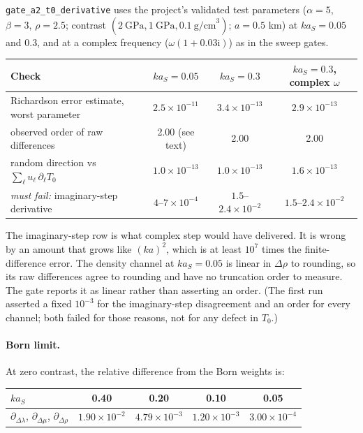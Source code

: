 \documentclass[11pt,a4paper]{article}
\newcommand{\ii}{\mathrm{i}}
\newcommand{\Tz}{T_0}
\begin{document}
\nolinkurl{gate_a2_t0_derivative} uses the project's validated test parameters ($\alpha=5$,
$\beta=3$, $\rho=2.5$; contrast $(2\ \text{GPa}, 1\ \text{GPa}, 0.1\ \text{g/cm}^3)$; $a=0.5$ km)
at $ka_S = 0.05$ and $0.3$, and at a complex frequency ($\omega(1+0.03\ii)$) as in the sweep
gates.

\begin{center}
\small
\setlength{\tabcolsep}{4pt}\begin{tabular}{@{}lccc@{}}
\toprule
Check & $ka_S=0.05$ & $ka_S=0.3$ & $ka_S=0.3$, complex $\omega$ \\
\midrule
Richardson error estimate, worst parameter & $2.5\times10^{-11}$ & $3.4\times10^{-13}$ & $2.9\times10^{-13}$ \\
observed order of raw differences & 2.00 (see text) & 2.00 & 2.00 \\
random direction vs $\sum_\ell u_\ell\,\partial_\ell\Tz$ & $1.0\times10^{-13}$ & $1.0\times10^{-13}$ & $1.6\times10^{-13}$ \\
\emph{must fail:} imaginary-step derivative & $4$--$7\times10^{-4}$ & $1.5$--$2.4\times10^{-2}$ & $1.5$--$2.4\times10^{-2}$ \\
\bottomrule
\end{tabular}
\end{center}

The imaginary-step row is what complex step would have delivered. It is wrong by an amount that
grows like $(ka)^2$, which is at least $10^7$ times the finite-difference error. The density
channel at $ka_S = 0.05$ is linear in $\Delta\rho$ to rounding, so its raw differences agree to
rounding and have no truncation order to measure. The gate reports it as linear rather than
asserting an order. (The first run asserted a fixed $10^{-3}$ for the imaginary-step disagreement
and an order for every channel; both failed for those reasons, not for any defect in $\Tz$.)

\paragraph{Born limit.} At zero contrast, the relative difference from the Born weights is:

\begin{center}
\small
\begin{tabular}{@{}lcccc@{}}
\toprule
$ka_S$ & 0.40 & 0.20 & 0.10 & 0.05 \\
\midrule
$\partial_{\Delta\lambda}$, $\partial_{\Delta\mu}$, $\partial_{\Delta\rho}$ &
$1.90\times10^{-2}$ & $4.79\times10^{-3}$ & $1.20\times10^{-3}$ & $3.00\times10^{-4}$ \\
\bottomrule
\end{tabular}
\end{center}
\end{document}
